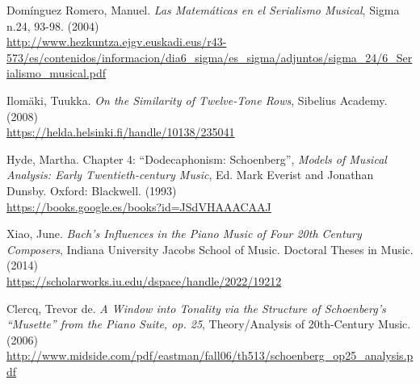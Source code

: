 \begin{thebibliography}{00}
			{ Dom\'inguez Romero, Manuel.} 
			\textit{Las Matem\'aticas en el Serialismo Musical},
			Sigma n.24, 93-98.
			(2004)
			\\\url{http://www.hezkuntza.ejgv.euskadi.eus/r43-573/es/contenidos/informacion/dia6_sigma/es_sigma/adjuntos/sigma_24/6_Serialismo_musical.pdf}

			
			{ Ilom\"aki, Tuukka.}
			\textit{On the Similarity of Twelve-Tone Rows},
			Sibelius Academy.
			(2008)
			\\\url{https://helda.helsinki.fi/handle/10138/235041}
			
			{ Hyde, Martha.} Chapter 4: ``Dodecaphonism: Schoenberg'',
			\textit{Models of Musical Analysis: Early Twentieth-century Music},
			Ed. Mark Everist and Jonathan Dunsby.
			Oxford: Blackwell.
			(1993)
			\\\url{https://books.google.es/books?id=JSdVHAAACAAJ}
					
			{ Xiao, June.} 
			\textit{Bach's Influences in the Piano Music of Four 20th Century Composers},
			Indiana University Jacobs School of Music.
			Doctoral Theses in Music.
			(2014)
			\\\url{https://scholarworks.iu.edu/dspace/handle/2022/19212}
			
			{ Clercq, Trevor de.} 
			\textit{A Window into Tonality via the Structure of Schoenberg's ``Musette'' from the Piano Suite, op. 25},
			Theory/Analysis of 20th-Century Music.
			(2006)
			\\\url{http://www.midside.com/pdf/eastman/fall06/th513/schoenberg_op25_analysis.pdf}
			

\end{thebibliography}
